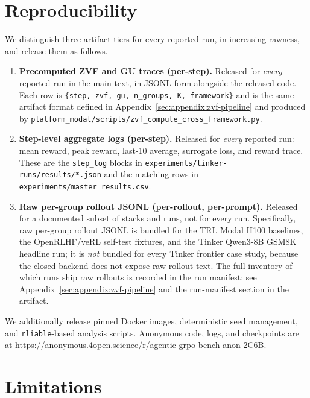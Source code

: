 \documentclass{article}
\begin{document}
\section{Reproducibility}
\label{sec:appendix:reproducibility}

We distinguish three artifact tiers for every reported run, in increasing
rawness, and release them as follows.

\begin{enumerate}
  \item \textbf{Precomputed ZVF and GU traces (per-step).} Released for
        \emph{every} reported run in the main text, in JSONL form alongside
        the released code. Each row is
        \texttt{\{step, zvf, gu, n\_groups, K, framework\}} and is the
        same artifact format defined in Appendix~\ref{sec:appendix:zvf-pipeline}
        and produced by \texttt{platform\_modal/scripts/zvf\_compute\_cross\_framework.py}.
  \item \textbf{Step-level aggregate logs (per-step).} Released for
        \emph{every} reported run: mean reward, peak reward, last-10
        average, surrogate loss, and reward trace. These are the
        \texttt{step\_log} blocks in
        \texttt{experiments/tinker-runs/results/*.json} and the matching
        rows in \texttt{experiments/master\_results.csv}.
  \item \textbf{Raw per-group rollout JSONL (per-rollout, per-prompt).}
        Released for a documented subset of stacks and runs, not for every
        run. Specifically, raw per-group rollout JSONL is bundled for the
        TRL Modal H100 baselines, the OpenRLHF/veRL self-test fixtures,
        and the Tinker Qwen3-8B GSM8K headline run; it is \emph{not}
        bundled for every Tinker frontier case study, because the closed
        backend does not expose raw rollout text. The full inventory of
        which runs ship raw rollouts is recorded in the run manifest;
        see Appendix~\ref{sec:appendix:zvf-pipeline} and the run-manifest
        section in the artifact.
\end{enumerate}

We additionally release pinned Docker images, deterministic seed management,
and \texttt{rliable}-based analysis scripts. Anonymous code, logs, and
checkpoints are at
\url{https://anonymous.4open.science/r/agentic-grpo-bench-anon-2C6B}.

\section{Limitations}
\label{sec:appendix:limitations}
\label{sec:limitations}
\end{document}
